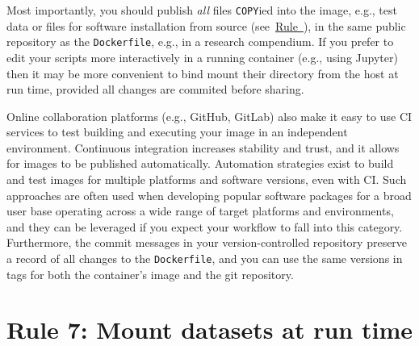 \documentclass[10pt,letterpaper]{article}
\begin{document}
Most importantly, you should publish \emph{all} files \texttt{COPY}ied
into the image, e.g., test data or files for software installation from
source (see~\hyperref[{rule:mount}]{Rule~}), in
the same public repository as the \texttt{Dockerfile}, e.g., in a
research compendium. If you prefer to edit your scripts more
interactively in a running container (e.g., using Jupyter) then it may
be more convenient to bind mount their directory from the host at run
time, provided all changes are commited before sharing.

Online collaboration platforms (e.g., GitHub, GitLab) also make it easy
to use CI services to test building and executing your image in an
independent environment. Continuous integration increases stability and
trust, and it allows for images to be published automatically.
Automation strategies exist to build and test images for multiple
platforms and software versions, even with CI. Such approaches are often
used when developing popular software packages for a broad user base
operating across a wide range of target platforms and environments, and
they can be leveraged if you expect your workflow to fall into this
category. Furthermore, the commit messages in your version-controlled
repository preserve a record of all changes to the \texttt{Dockerfile},
and you can use the same versions in tags for both the container's image
and the git repository.

\hypertarget{rule-7-mount-datasets-at-run-time}{%
\section*{Rule 7: Mount datasets at run
time}\label{rule-7-mount-datasets-at-run-time}}

  \label{rule:mount} 
\end{document}
